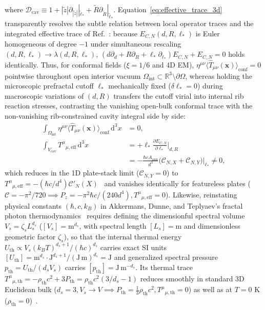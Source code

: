 \documentclass[aps,prd,twocolumn,10pt,showkeys,nofootinbib,floatfix,longbibliography]{revtex4-2}
\newcommand{\dd}{\mathrm{d}}
\begin{document}
where $\mathcal{D}_{\mathrm{cav}} \equiv 1 + |\tilde{z}|\partial_{|\tilde{z}|}|_{\tilde{\ell}_*} + \tilde{R}\partial_{\tilde{R}}|_{\tilde{\ell}_*}$. Equation~\eqref{eq:effective_trace_3d} transparently resolves the subtle relation between local operator traces and the integrated effective trace of Ref.~\cite{gordon2026prd}: because $E_{C,N}(d, R, \ell_*)$ is Euler homogeneous of degree $-1$ under simultaneous rescaling $(d, R, \ell_*) \to \lambda(d, R, \ell_*)$, $(d\partial_d + R\partial_R + \ell_*\partial_{\ell_*})E_{C,N} + E_{C,N} = 0$ holds identically. Thus, for conformal fields ($\xi = 1/6$ and 4D EM), $\eta^{\mu\nu}\langle\hat{T}_{\mu\nu}(\mathbf{x})\rangle_{\mathrm{conf}} = 0$ pointwise throughout open interior vacuum $\Omega_{\mathrm{int}} \subset \mathbb{R}^3 \setminus \partial\Omega$, whereas holding the microscopic prefractal cutoff $\ell_*$ mechanically fixed ($\delta\ell_* = 0$) during macroscopic variations of $(d, R)$ transfers the cutoff virial into internal rib reaction stresses, contrasting the vanishing open-bulk conformal trace with the non-vanishing rib-constrained cavity integral side by side:
\begin{align*}
\int_{\Omega_{\mathrm{int}}} \eta^{\mu\nu}\langle\hat{T}_{\mu\nu}(\mathbf{x})\rangle_{\mathrm{conf}}\,\dd^3x &= 0, \\
\int_{V_{\mathrm{cav}}} T^\mu{}_{\mu,\mathrm{eff}}\,\dd^3x &= +\ell_*\frac{\partial E_{C,N}}{\partial\ell_*}\Bigg|_{d,R} \\
&= -\frac{\hbar c A_{\mathrm{ann}}}{d^3}\bigl(\mathcal{C}_{N,X} + \mathcal{C}_{N,Y}\bigr)\Big|_{\ell_*} \neq 0,
\end{align*}
which reduces in the 1D plate-stack limit ($\mathcal{C}_{N,Y} = 0$) to $T^\mu{}_{\mu,\mathrm{eff}} = -(\hbar c/d^4)\mathcal{C}'_N(X)$~\cite{gordon2026prd} and vanishes identically for featureless plates ($\mathcal{C} = -\pi^2/720 \implies P_z = -\pi^2\hbar c/(240 d^4), T^\mu{}_{\mu,\mathrm{eff}} = 0$). Likewise, reinstating physical constants $(\hbar, c, k_B)$ in Akkermans, Dunne, and Teplyaev's fractal photon thermodynamics~\cite{akkermans2010,gordon2026prd} requires defining the dimensionful spectral volume $V_s = \zeta_s L_s^{d_s}$ ($[V_s] = \mathrm{m}^{d_s}$, with spectral length $[L_s] = \mathrm{m}$ and dimensionless geometric factor $\zeta_s$), so that the internal thermal energy $U_{\mathrm{th}} \propto V_s (k_B T)^{d_s+1}/(\hbar c)^{d_s}$ carries exact SI units $[U_{\mathrm{th}}] = \mathrm{m}^{d_s}\cdot\mathrm{J}^{d_s+1}/(\mathrm{J}\,\mathrm{m})^{d_s} = \mathrm{J}$ and generalized spectral pressure $p_{\mathrm{th}} = U_{\mathrm{th}}/(d_s V_s)$ carries $[p_{\mathrm{th}}] = \mathrm{J}\,\mathrm{m}^{-d_s}$. Its thermal trace $T^\mu{}_{\mu,\mathrm{th}} = -\rho_{\mathrm{th}}c^2 + 3P_{\mathrm{th}} = \rho_{\mathrm{th}}c^2(3/d_s - 1)$ reduces smoothly in standard 3D Euclidean bulk ($d_s = 3, V_s \to V \implies P_{\mathrm{th}} = \frac{1}{3}\rho_{\mathrm{th}}c^2, T^\mu{}_{\mu,\mathrm{th}} = 0$) as well as at $T = 0\text{ K}$ ($\rho_{\mathrm{th}} = 0$)~\cite{lapidus1991tams}.
\end{document}
